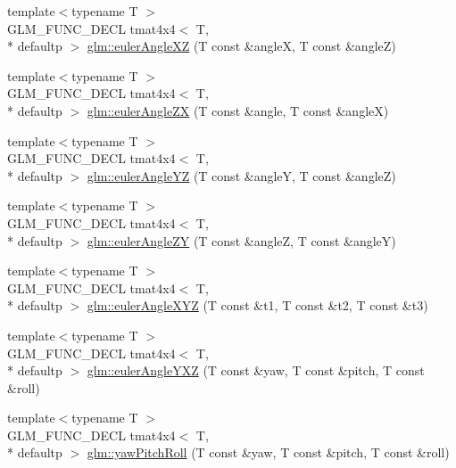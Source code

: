\begin{DoxyCompactItemize}
\item 
{\footnotesize template$<$typename T $>$ }\\G\-L\-M\-\_\-\-F\-U\-N\-C\-\_\-\-D\-E\-C\-L tmat4x4$<$ T, \\*
defaultp $>$ \hyperlink{group__gtx__euler__angles_gab2d7dc94b9a7519d741aaa208c7a335b}{glm\-::euler\-Angle\-X\-Z} (T const \&angle\-X, T const \&angle\-Z)
\item 
{\footnotesize template$<$typename T $>$ }\\G\-L\-M\-\_\-\-F\-U\-N\-C\-\_\-\-D\-E\-C\-L tmat4x4$<$ T, \\*
defaultp $>$ \hyperlink{group__gtx__euler__angles_gaef83cf40bd9ae780011b29970f16f622}{glm\-::euler\-Angle\-Z\-X} (T const \&angle, T const \&angle\-X)
\item 
{\footnotesize template$<$typename T $>$ }\\G\-L\-M\-\_\-\-F\-U\-N\-C\-\_\-\-D\-E\-C\-L tmat4x4$<$ T, \\*
defaultp $>$ \hyperlink{group__gtx__euler__angles_ga1033f84f51d61646145352ef0c1bb58c}{glm\-::euler\-Angle\-Y\-Z} (T const \&angle\-Y, T const \&angle\-Z)
\item 
{\footnotesize template$<$typename T $>$ }\\G\-L\-M\-\_\-\-F\-U\-N\-C\-\_\-\-D\-E\-C\-L tmat4x4$<$ T, \\*
defaultp $>$ \hyperlink{group__gtx__euler__angles_ga02f037926568bbd12dfece3b28b20343}{glm\-::euler\-Angle\-Z\-Y} (T const \&angle\-Z, T const \&angle\-Y)
\item 
{\footnotesize template$<$typename T $>$ }\\G\-L\-M\-\_\-\-F\-U\-N\-C\-\_\-\-D\-E\-C\-L tmat4x4$<$ T, \\*
defaultp $>$ \hyperlink{group__gtx__euler__angles_gaaedda1657a1aebe0a904d864b33844e8}{glm\-::euler\-Angle\-X\-Y\-Z} (T const \&t1, T const \&t2, T const \&t3)
\item 
{\footnotesize template$<$typename T $>$ }\\G\-L\-M\-\_\-\-F\-U\-N\-C\-\_\-\-D\-E\-C\-L tmat4x4$<$ T, \\*
defaultp $>$ \hyperlink{group__gtx__euler__angles_ga0242b5ab68651db70c6025815549427f}{glm\-::euler\-Angle\-Y\-X\-Z} (T const \&yaw, T const \&pitch, T const \&roll)
\item 
{\footnotesize template$<$typename T $>$ }\\G\-L\-M\-\_\-\-F\-U\-N\-C\-\_\-\-D\-E\-C\-L tmat4x4$<$ T, \\*
defaultp $>$ \hyperlink{group__gtx__euler__angles_gaf9c8d0f1df88c5344165600774489bc5}{glm\-::yaw\-Pitch\-Roll} (T const \&yaw, T const \&pitch, T const \&roll)

\end{DoxyCompactItemize}
